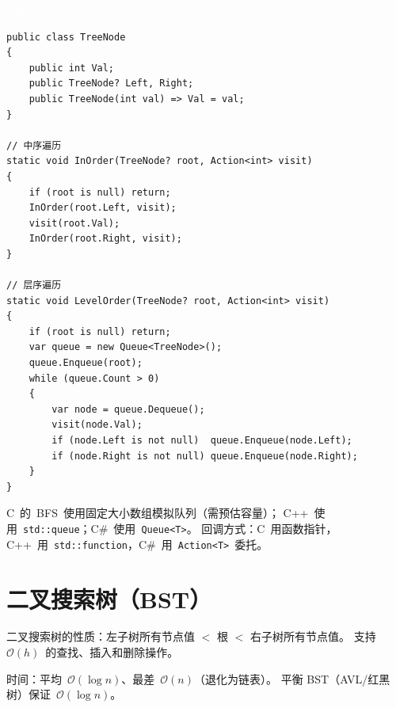 \documentclass[12pt,a4paper,fontset=fandol]{ctexbook}
\newcommand{\csharplabel}{%
  \noindent\begin{tcolorbox}[sharp corners,colback=csharpheadbg,colframe=csharpheadbg,
    left=6pt,right=6pt,top=2pt,bottom=2pt,boxrule=0pt]
  \textcolor{white}{\small\bfseries\sffamily C\#}\end{tcolorbox}%
}
\newcommand{\bigO}[1]{\mathcal{O}(#1)}
\newcommand{\Tp}[1]{\texttt{#1}}
\begin{document}
\csharplabel
\begin{lstlisting}[style=csharpstyle]
public class TreeNode
{
    public int Val;
    public TreeNode? Left, Right;
    public TreeNode(int val) => Val = val;
}

// 中序遍历
static void InOrder(TreeNode? root, Action<int> visit)
{
    if (root is null) return;
    InOrder(root.Left, visit);
    visit(root.Val);
    InOrder(root.Right, visit);
}

// 层序遍历
static void LevelOrder(TreeNode? root, Action<int> visit)
{
    if (root is null) return;
    var queue = new Queue<TreeNode>();
    queue.Enqueue(root);
    while (queue.Count > 0)
    {
        var node = queue.Dequeue();
        visit(node.Val);
        if (node.Left is not null)  queue.Enqueue(node.Left);
        if (node.Right is not null) queue.Enqueue(node.Right);
    }
}
\end{lstlisting}

\begin{compare}
C~的~BFS~使用固定大小数组模拟队列（需预估容量）；
C++~使用~\Tp{std::queue}；C\#~使用~\Tp{Queue<T>}。
回调方式：C~用函数指针，C++~用~\Tp{std::\allowbreak{}function}，C\#~用~\Tp{Action<T>}~委托。
\end{compare}

\chapter{二叉搜索树（BST）}

二叉搜索树的性质：左子树所有节点值 $<$ 根 $<$ 右子树所有节点值。
支持~$\bigO{h}$~的查找、插入和删除操作。

\begin{complexitybox}
  时间：平均~$\bigO{\log n}$、最差~$\bigO{n}$（退化为链表）。
  平衡 BST（AVL/红黑树）保证~$\bigO{\log n}$。
\end{complexitybox}
\end{document}
